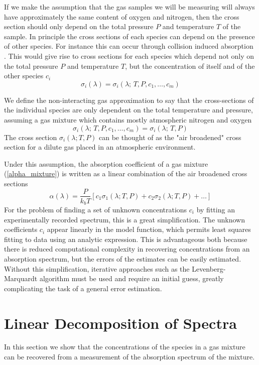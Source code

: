 \documentclass[8pt,a4paper]{report}
\begin{document}
	If we make the assumption that the gas samples we will be measuring will always have approximately the same content of oxygen and nitrogen, then the cross section should only depend on the total pressure $P$ and temperature $T$ of the sample. In principle the cross sections of each species can depend on the presence of other species. For instance this can occur through collision induced absorption \cite{hitran_cia_2019}. This would give rise to cross sections for each species which depend not only on the total pressure $P$ and temperature $T$, but the concentration of itself and of the other species $c_i$
	\begin{equation*}
		\sigma_i(\lambda) = \sigma_i(\lambda ;\,T, P,c_1, \ldots, c_m)
	\end{equation*}
	
	We define the non-interacting gas approximation to say that the cross-sections of the individual species are only dependent on the total temperature and pressure, assuming a gas mixture which contains mostly atmospheric nitrogen and oxygen
	\begin{equation}
		\sigma_i(\lambda ;\,T, P,c_1, \ldots, c_m) = \sigma_i(\lambda ;\,T, P)
	\end{equation}
	The cross section $\sigma_i(\lambda; T, P)$ can be thought of as the "air broadened" cross section for a dilute gas placed in an atmospheric environment.
	
	Under this assumption, the absorption coefficient of a gas mixture (\ref{alpha_mixture}) is written as a linear combination of the air broadened cross sections
	\begin{equation} \label{alpha_dilute}
		\alpha(\lambda) = \frac{P}{k_b T} \left[c_1\sigma_1(\lambda; T, P) + c_2 \sigma_2(\lambda; T, P) + \ldots \right]
	\end{equation}
	For the problem of finding a set of unknown concentrations $c_i$ by fitting an experimentally recorded spectrum, this is a great simplification. The unknown coefficients $c_i$ appear linearly in the model function, which permits least squares fitting to data using an analytic expression. This is advantageous both because there is reduced computational complexity in recovering concentrations from an absorption spectrum, but the errors of the estimates can be easily estimated. Without this simplification, iterative approaches such as the Levenberg-Marquardt algorithm must be used and require an initial guess, greatly complicating the task of a general error estimation.
	
	\section{Linear Decomposition of Spectra}
	In this section we show that the concentrations of the species in a gas mixture can be recovered from a measurement of the absorption spectrum of the mixture. 
	
\end{document}
